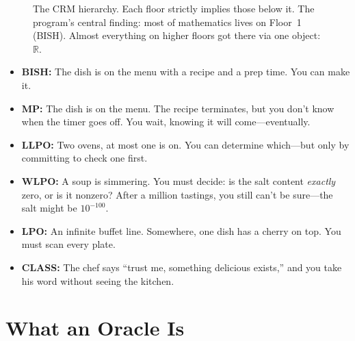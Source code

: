 \documentclass[11pt,twoside,openany]{report}
\theoremstyle{remark}
\newcommand{\BISH}{\textsf{BISH}}
\newcommand{\WLPO}{\textsf{WLPO}}
\newcommand{\LLPO}{\textsf{LLPO}}
\newcommand{\LPO}{\textsf{LPO}}
\newcommand{\CLASS}{\textsf{CLASS}}
\newcommand{\MP}{\textsf{MP}}
\begin{document}
\begin{figure}[htbp]
\caption{The CRM hierarchy. Each floor strictly implies those below it. The program's central finding: most of mathematics lives on Floor~1 (\BISH). Almost everything on higher floors got there via one object: $\mathbb{R}$.}
\label{fig:hierarchy}
\end{figure}

\begin{analogybox}
\begin{itemize}
  \item \textbf{\BISH:} The dish is on the menu with a recipe and a prep time. You can make it.
  \item \textbf{\MP:} The dish is on the menu. The recipe terminates, but you don't know when the timer goes off. You wait, knowing it will come---eventually.
  \item \textbf{\LLPO:} Two ovens, at most one is on. You can determine which---but only by committing to check one first.
  \item \textbf{\WLPO:} A soup is simmering. You must decide: is the salt content \emph{exactly} zero, or is it nonzero? After a million tastings, you still can't be sure---the salt might be $10^{-100}$.
  \item \textbf{\LPO:} An infinite buffet line. Somewhere, one dish has a cherry on top. You must scan every plate.
  \item \textbf{\CLASS:} The chef says ``trust me, something delicious exists,'' and you take his word without seeing the kitchen.
\end{itemize}
\end{analogybox}


\section{What an Oracle Is}
\end{document}

